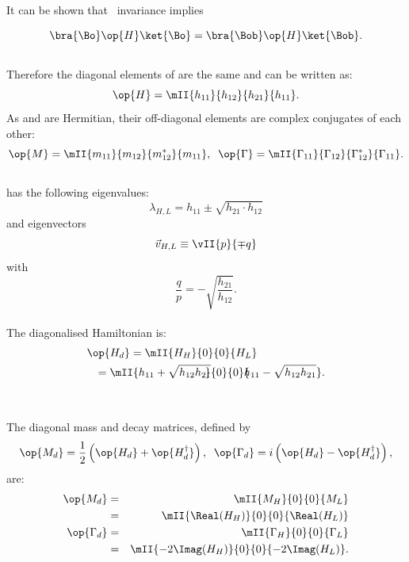 It can be shown that \cpt\ invariance implies
 

\begin{equation}
\bra{\Bo}\op{H}\ket{\Bo} = \bra{\Bob}\op{H}\ket{\Bob}.
\end{equation}\\
 Therefore the diagonal elements of  are the same and  can
 be written as:
\begin{equation}
\op{H}=\mII{h_{11}}{h_{12}}{h_{21}}{h_{11}}.
\end{equation}
 As  and \op{\Gamma} are Hermitian, their off-diagonal elements
 are complex conjugates of each other:
\begin{equation}
\op{M}=\mII{m_{11}}{m_{12}}{m_{12}^*}{m_{11}}
,\;\;
\op{\Gamma}=\mII{\Gamma_{11}}{\Gamma_{12}}{\Gamma_{12}^*}{\Gamma_{11}}.
\end{equation}\\
  has the following eigenvalues:
\begin{equation}
\lambda_{H,L}=h_{11}\pm \sqrt{h_{21}\cdot h_{12}}
\end{equation}
 and eigenvectors
\begin{equation}
\vec{v}_{H,L}\equiv\vII{p}{\mp q}
\end{equation}
 with 
\begin{equation}
\frac{q}{p}= -\sqrt{\frac{h_{21}}{h_{12}}}.
\end{equation}\\
 The diagonalised Hamiltonian  is:
{\small
\begin{eqnarray}
%
\lefteqn{\op{H_d} = \mII{H_H}{0}{0}{H_L} }\nonumber\\
         & &
= \mII{h_{11} + \sqrt{h_{12} h_{21}}\!\!\!}{0}
    {0}{\!\!\!h_{11} - \sqrt{h_{12} h_{21}}}
.
\nonumber\\
\mbox{}
\end{eqnarray}}\\
 The diagonal mass and decay matrices, defined by
\begin{equation}
\op{M_d}=\frac{1}{2}\left(\op{H_d}+\op{H^{\dagger}_d}\right), \;\;
\op{\Gamma_d}=i\left(\op{H_d} - \op{H^{\dagger}_d}\right)
,
\end{equation}
 are:
\begin{eqnarray}
\op{M_d}&=&\mII{M_H}{0}{0}{M_L} \nonumber\\
        &=&\mII{\Real\!\left(H_H\right)}{0}{0}{\Real\!\left(H_L\right)}\\
\op{\Gamma_d}&=&\mII{\Gamma_H}{0}{0}{\Gamma_L} \nonumber\\
             &=&\mII{-2\Imag\!\left(H_H\right)}{0}{0}{-2\Imag\!\left(H_L\right)}
.
\nonumber\\
\mbox{}
\end{eqnarray}
